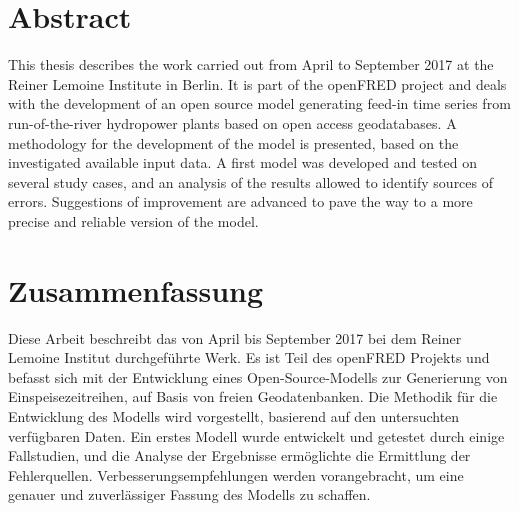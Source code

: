 \chapter*{Abstract}
\label{chap:abstract}

This thesis describes the work carried out from April to September 2017 at the Reiner Lemoine Institute in Berlin. It is part of the openFRED project and deals with the development of an open source model generating feed-in time series from run-of-the-river hydropower plants based on open access geodatabases. A methodology for the development of the model is presented, based on the investigated available input data. A first model was developed and tested on several study cases, and an analysis of the results allowed to identify sources of errors. Suggestions of improvement are advanced to pave the way to a more precise and reliable version of the model.


{\let\clearpage\relax\chapter*{Zusammenfassung}}

Diese Arbeit beschreibt das von April bis September 2017 bei dem Reiner Lemoine Institut durchgeführte Werk. Es ist Teil des openFRED Projekts und befasst sich mit der Entwicklung eines Open-Source-Modells zur Generierung von Einspeisezeitreihen, auf Basis von freien Geodatenbanken. Die Methodik für die Entwicklung des Modells wird vorgestellt, basierend auf den untersuchten verfügbaren Daten. Ein erstes Modell wurde entwickelt und getestet durch einige Fallstudien, und die Analyse der Ergebnisse ermöglichte die Ermittlung der Fehlerquellen. Verbesserungsempfehlungen werden vorangebracht, um eine genauer und zuverlässiger Fassung des Modells zu schaffen.

